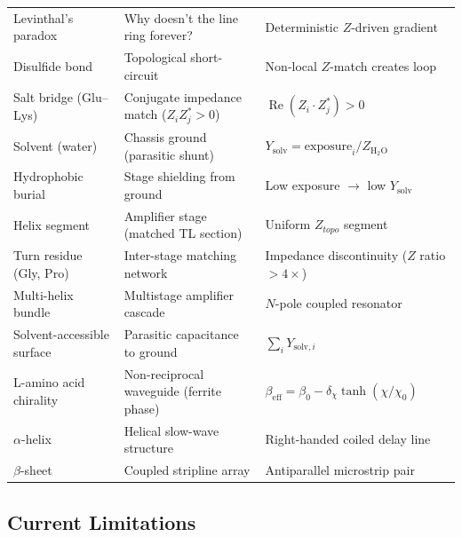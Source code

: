 \begin{table}[H]
\begin{tabular}{@{}p{5.5cm} p{5.5cm} p{4cm}@{}}
Levinthal's paradox & Why doesn't the line ring forever? & Deterministic $Z$-driven gradient \\
Disulfide bond & Topological short-circuit & Non-local $Z$-match creates loop \\
Salt bridge (Glu--Lys) & Conjugate impedance match ($Z_i Z_j^* > 0$) & $\operatorname{Re}(Z_i \cdot Z_j^*) > 0$ \\
Solvent (water) & Chassis ground (parasitic shunt) & $Y_{\text{solv}} = \text{exposure}_i / Z_{\text{H}_2\text{O}}$ \\
Hydrophobic burial & Stage shielding from ground & Low exposure $\to$ low $Y_{\text{solv}}$ \\
Helix segment & Amplifier stage (matched TL section) & Uniform $Z_{topo}$ segment \\
Turn residue (Gly, Pro) & Inter-stage matching network & Impedance discontinuity ($Z$ ratio $> 4\times$) \\
Multi-helix bundle & Multistage amplifier cascade & $N$-pole coupled resonator \\
Solvent-accessible surface & Parasitic capacitance to ground & $\sum_i Y_{\text{solv},i}$ \\
L-amino acid chirality & Non-reciprocal waveguide (ferrite phase) & $\beta_{\text{eff}} = \beta_0 - \delta_\chi \tanh(\chi/\chi_0)$ \\
$\alpha$-helix & Helical slow-wave structure & Right-handed coiled delay line \\
$\beta$-sheet & Coupled stripline array & Antiparallel microstrip pair \\
\bottomrule
\end{tabular}
\end{table}

\subsection{Current Limitations}

